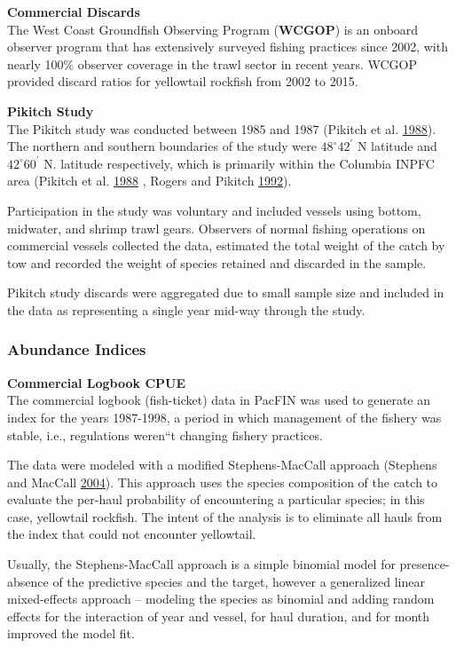 \documentclass[12pt,]{article}
\begin{document}
\textbf{Commercial Discards}\\
The West Coast Groundfish Observing Program (\textbf{WCGOP}) is an
onboard observer program that has extensively surveyed fishing practices
since 2002, with nearly 100\% observer coverage in the trawl sector in
recent years. WCGOP provided discard ratios for yellowtail rockfish from
2002 to 2015.

\textbf{Pikitch Study}\\
The Pikitch study was conducted between 1985 and 1987 (Pikitch et al.
\protect\hyperlink{ref-Pikitch1988}{1988}). The northern and southern
boundaries of the study were \(48^\circ 42^\prime\) N latitude and
\(42^\circ 60^\prime\) N. latitude respectively, which is primarily
within the Columbia INPFC area (Pikitch et al.
\protect\hyperlink{ref-Pikitch1988}{1988} , Rogers and Pikitch
\protect\hyperlink{ref-Rogers1992}{1992}).

Participation in the study was voluntary and included vessels using
bottom, midwater, and shrimp trawl gears. Observers of normal fishing
operations on commercial vessels collected the data, estimated the total
weight of the catch by tow and recorded the weight of species retained
and discarded in the sample.

Pikitch study discards were aggregated due to small sample size and
included in the data as representing a single year mid-way through the
study.

\subsubsection{Abundance Indices}\label{abundance-indices}

\textbf{Commercial Logbook CPUE}\\
The commercial logbook (fish-ticket) data in PacFIN was used to generate
an index for the years 1987-1998, a period in which management of the
fishery was stable, i.e., regulations weren``t changing fishery
practices.

The data were modeled with a modified Stephens-MacCall approach
(Stephens and MacCall \protect\hyperlink{ref-Stephens2004}{2004}). This
approach uses the species composition of the catch to evaluate the
per-haul probability of encountering a particular species; in this case,
yellowtail rockfish. The intent of the analysis is to eliminate all
hauls from the index that could not encounter yellowtail.

Usually, the Stephens-MacCall approach is a simple binomial model for
presence-absence of the predictive species and the target, however a
generalized linear mixed-effects approach -- modeling the species as
binomial and adding random effects for the interaction of year and
vessel, for haul duration, and for month improved the model fit.
\end{document}

